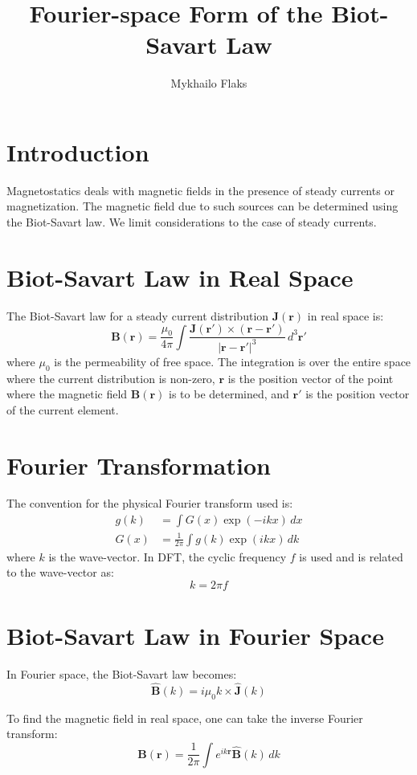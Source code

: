 \documentclass[justified, nobib]{tufte-handout}
\title{Fourier-space Form of the Biot-Savart Law}
\author{Mykhailo Flaks}
\begin{document}
\maketitle

\section{Introduction}
Magnetostatics deals with magnetic fields in the presence of steady currents or magnetization. The magnetic field due to such sources can be determined using the Biot-Savart law. We limit considerations to the case of steady currents. 

\section{Biot-Savart Law in Real Space}
The Biot-Savart law for a steady current distribution \( \mathbf{J}(\mathbf{r}) \) in real space is:
\[
\mathbf{B}(\mathbf{r}) = \frac{\mu_0}{4\pi} \int \frac{\mathbf{J}(\mathbf{r'}) \times (\mathbf{r} - \mathbf{r'})}{|\mathbf{r} - \mathbf{r'}|^3} \, d^3\mathbf{r'}
\]
where \(\mu_0\) is the permeability of free space. The integration is over the entire space where the current distribution is non-zero, \( \mathbf{r} \) is the position vector of the point where the magnetic field \(\mathbf{B}(\mathbf{r})\) is to be determined, and \( \mathbf{r'} \) is the position vector of the current element.

\section{Fourier Transformation}
The convention for the physical Fourier transform used is:
\begin{align*}
g(k) &= \int G(x) \exp(-ikx) \, dx \\
G(x) &= \frac{1}{2\pi} \int g(k) \exp(ikx) \, dk
\end{align*}
where \( k \) is the wave-vector. In DFT, the cyclic frequency \( f \) is used and is related to the wave-vector as:
\[
k = 2\pi f
\]

\section{Biot-Savart Law in Fourier Space}
In Fourier space, the Biot-Savart law becomes:
\[
\hat{\mathbf{B}}(k) = i\mu_0 k \times \hat{\mathbf{J}}(k)
\]

To find the magnetic field in real space, one can take the inverse Fourier transform:
\[
\mathbf{B}(\mathbf{r}) = \frac{1}{2\pi} \int e^{ik\mathbf{r}} \hat{\mathbf{B}}(k) \, dk
\]
\end{document}
